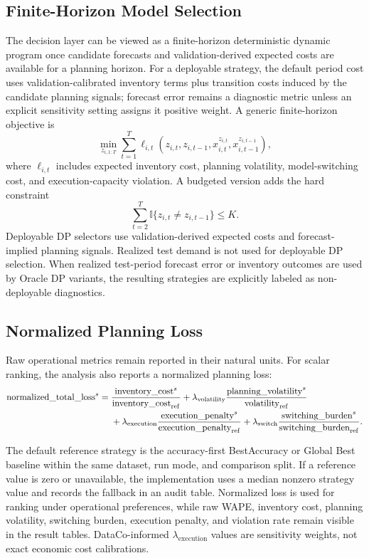 \subsection{Finite-Horizon Model Selection}

The decision layer can be viewed as a finite-horizon deterministic dynamic program once candidate forecasts and validation-derived expected costs are available for a planning horizon. For a deployable strategy, the default period cost uses validation-calibrated inventory terms plus transition costs induced by the candidate planning signals; forecast error remains a diagnostic metric unless an explicit sensitivity setting assigns it positive weight. A generic finite-horizon objective is
\begin{equation}
    \min_{z_{i,1:T}}
    \sum_{t=1}^{T}
    \ell_{i,t}\left(z_{i,t}, z_{i,t-1}, x_{i,t}^{z_{i,t}}, x_{i,t-1}^{z_{i,t-1}}\right),
\end{equation}
where $\ell_{i,t}$ includes expected inventory cost, planning volatility, model-switching cost, and execution-capacity violation. A budgeted version adds the hard constraint
\begin{equation}
    \sum_{t=2}^{T}\mathbb{I}\{z_{i,t} \neq z_{i,t-1}\} \leq K.
\end{equation}
Deployable DP selectors use validation-derived expected costs and forecast-implied planning signals. Realized test demand is not used for deployable DP selection. When realized test-period forecast error or inventory outcomes are used by Oracle DP variants, the resulting strategies are explicitly labeled as non-deployable diagnostics.

\subsection{Normalized Planning Loss}

Raw operational metrics remain reported in their natural units. For scalar ranking, the analysis also reports a normalized planning loss:
\begin{align}
    \mathrm{normalized\_total\_loss}^{s}
    ={}&
    \frac{\mathrm{inventory\_cost}^{s}}{\mathrm{inventory\_cost}_{\mathrm{ref}}}
    + \lambda_{\mathrm{volatility}}
    \frac{\mathrm{planning\_volatility}^{s}}{\mathrm{volatility}_{\mathrm{ref}}} \notag \\
    &+ \lambda_{\mathrm{execution}}
    \frac{\mathrm{execution\_penalty}^{s}}{\mathrm{execution\_penalty}_{\mathrm{ref}}}
    + \lambda_{\mathrm{switch}}
    \frac{\mathrm{switching\_burden}^{s}}{\mathrm{switching\_burden}_{\mathrm{ref}}}.
\end{align}

The default reference strategy is the accuracy-first BestAccuracy or Global Best baseline within the same dataset, run mode, and comparison split. If a reference value is zero or unavailable, the implementation uses a median nonzero strategy value and records the fallback in an audit table. Normalized loss is used for ranking under operational preferences, while raw WAPE, inventory cost, planning volatility, switching burden, execution penalty, and violation rate remain visible in the result tables. DataCo-informed $\lambda_{\mathrm{execution}}$ values are sensitivity weights, not exact economic cost calibrations.
